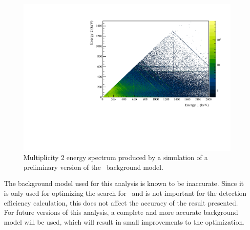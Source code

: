 \documentclass[/main.tex]{subfiles}
\begin{document}
\begin{figure}
  \centering
  \includegraphics[width=.9\linewidth]{BGsim2D}
  \caption[Simulation of multiplicty 2 events from the background model]{ \label{fig:bgsim2D}
    Multiplicity 2 energy spectrum produced by a simulation of a preliminary version of the \MJD\ background model.
  }
\end{figure}
The background model used for this analysis is known to be inaccurate.
Since it is only used for optimizing the search for \bbes\ and is not important for the detection efficiency calculation, this does not affect the accuracy of the result presented.
For future versions of this analysis, a complete and more accurate background model will be used, which will result in small improvements to the optimization.
\end{document}
